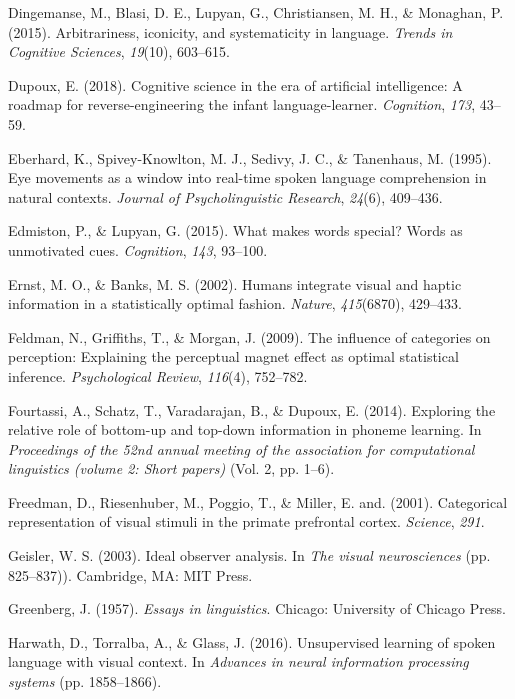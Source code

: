 \documentclass[english,floatsintext,man]{apa6}
\theoremstyle{definition}
\theoremstyle{definition}
\theoremstyle{definition}
\theoremstyle{remark}
\begin{document}
\hypertarget{ref-dingemanse2015}{}
Dingemanse, M., Blasi, D. E., Lupyan, G., Christiansen, M. H., \&
Monaghan, P. (2015). Arbitrariness, iconicity, and systematicity in
language. \emph{Trends in Cognitive Sciences}, \emph{19}(10), 603--615.

\hypertarget{ref-dupoux2018}{}
Dupoux, E. (2018). Cognitive science in the era of artificial
intelligence: A roadmap for reverse-engineering the infant
language-learner. \emph{Cognition}, \emph{173}, 43--59.

\hypertarget{ref-Eberhard1995}{}
Eberhard, K., Spivey-Knowlton, M. J., Sedivy, J. C., \& Tanenhaus, M.
(1995). Eye movements as a window into real-time spoken language
comprehension in natural contexts. \emph{Journal of Psycholinguistic
Research}, \emph{24}(6), 409--436.

\hypertarget{ref-edmiston2015}{}
Edmiston, P., \& Lupyan, G. (2015). What makes words special? Words as
unmotivated cues. \emph{Cognition}, \emph{143}, 93--100.

\hypertarget{ref-ernst02}{}
Ernst, M. O., \& Banks, M. S. (2002). Humans integrate visual and haptic
information in a statistically optimal fashion. \emph{Nature},
\emph{415}(6870), 429--433.

\hypertarget{ref-feldman2009}{}
Feldman, N., Griffiths, T., \& Morgan, J. (2009). The influence of
categories on perception: Explaining the perceptual magnet effect as
optimal statistical inference. \emph{Psychological Review},
\emph{116}(4), 752--782.

\hypertarget{ref-fourtassi2014b}{}
Fourtassi, A., Schatz, T., Varadarajan, B., \& Dupoux, E. (2014).
Exploring the relative role of bottom-up and top-down information in
phoneme learning. In \emph{Proceedings of the 52nd annual meeting of the
association for computational linguistics (volume 2: Short papers)}
(Vol. 2, pp. 1--6).

\hypertarget{ref-freedman2001}{}
Freedman, D., Riesenhuber, M., Poggio, T., \& Miller, E. and. (2001).
Categorical representation of visual stimuli in the primate prefrontal
cortex. \emph{Science}, \emph{291}.

\hypertarget{ref-Geisler2003}{}
Geisler, W. S. (2003). Ideal observer analysis. In \emph{The visual
neurosciences} (pp. 825--837)). Cambridge, MA: MIT Press.

\hypertarget{ref-greenberg1957}{}
Greenberg, J. (1957). \emph{Essays in linguistics}. Chicago: University
of Chicago Press.

\hypertarget{ref-harwath2016}{}
Harwath, D., Torralba, A., \& Glass, J. (2016). Unsupervised learning of
spoken language with visual context. In \emph{Advances in neural
information processing systems} (pp. 1858--1866).
\end{document}

